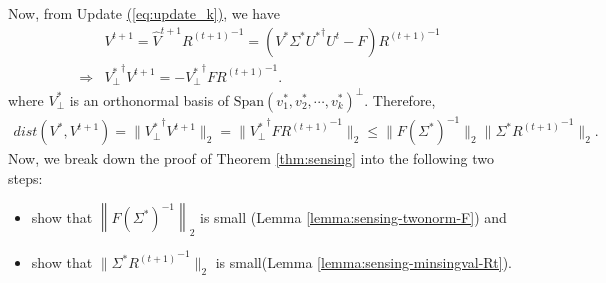 \documentclass[11pt]{article}
\renewcommand{\eqref}[1]{\hyperref[#1]{(\ref*{#1})}}
\theoremstyle{plain}
\theoremstyle{definition}
\newcommand{\iprod}[2]{\langle #1, #2 \rangle}
\newcommand{\eqdef}{\stackrel{\textrm{def}}{=}}
\newcommand{\twonorm}[1]{\left\| {#1} \right\|_2}
\begin{document}
Now, from Update \eqref{eq:update_k}, we have
\begin{align}
  &V^{t+1} = \widehat{V}^{t+1}{R^{(t+1)}}^{-1} = \left(V^*\Sigma^*{U^*}^\dag  U^{t} - F\right){R^{(t+1)}}^{-1} \nonumber\\
  \Rightarrow & {V_{\perp}^*}^\dag V^{t+1} = -{V_{\perp}^*}^\dag  F {R^{(t+1)}}^{-1}.\label{eqn:sensing-orthogonaliter-error}
\end{align}
where $V_{\perp}^*$ is an orthonormal basis of  $\textrm{Span}\left(v_1^*,v_2^*,\cdots,v_k^*\right)^{\perp}$. Therefore, 
\begin{multline*}
dist(V^*, V^{t+1})=\|{V_{\perp}^*}^\dag V^{t+1}\|_2=\|{V_{\perp}^*}^\dag  F {R^{(t+1)}}^{-1}\|_2\leq \|F(\Sigma^*)^{-1}\|_2\|\Sigma^*{R^{(t+1)}}^{-1}\|_2.\end{multline*}
Now, we break down the proof of Theorem \ref{thm:sensing} into the following two steps: 
\begin{itemize}\setlength{\topsep}{0pt}\setlength{\itemsep}{0pt}
  \item show that $\twonorm{F(\Sigma^*)^{-1}}$ is  small (Lemma \ref{lemma:sensing-twonorm-F}) and
  \item show that $\|\Sigma^*{R^{(t+1)}}^{-1}\|_2$ is small(Lemma \ref{lemma:sensing-minsingval-Rt}).
\end{itemize}
\end{document}
